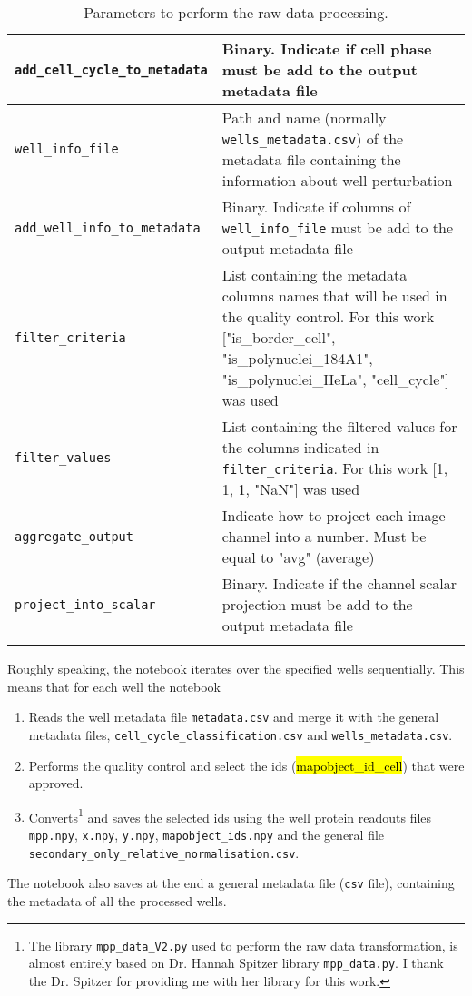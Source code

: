 \begin{longtable}{>{\centering\arraybackslash}m{\mylengtha} | m{\mylengthb}}
    \texttt{add\_cell\_cycle\_to\_metadata} & Binary. Indicate if cell phase must be add to the output metadata file \\
    \hline
    \texttt{well\_info\_file} & Path and name (normally \texttt{wells\_metadata.csv}) of the metadata file containing the information about well perturbation \\
    \hline
    \texttt{add\_well\_info\_to\_metadata} & Binary. Indicate if columns of \texttt{well\_info\_file} must be add to the output metadata file \\
    \hline
    \texttt{filter\_criteria} & List containing the metadata columns names that will be used in the quality control. For this work ["is\_border\_cell", "is\_polynuclei\_184A1", "is\_polynuclei\_HeLa", "cell\_cycle"] was used \\
    \hline
    \texttt{filter\_values} & List containing the filtered values for the columns indicated in \texttt{filter\_criteria}. For this work [1, 1, 1, "NaN"] was used \\
    \hline
    \texttt{aggregate\_output} & Indicate how to project each image channel into a number. Must be equal to "avg" (average) \\
    \hline
    \texttt{project\_into\_scalar} & Binary. Indicate if the channel scalar projection must be add to the output metadata file \\
    \hline
  \caption{Parameters to perform the raw data processing.}
  \label{table:row_data_in:params}
\end{longtable}

Roughly speaking, the notebook iterates over the specified wells sequentially. This means that for each well the notebook
\begin{enumerate}
  \item Reads the well metadata file \texttt{metadata.csv} and merge it with the general metadata files, \texttt{cell\_cycle\_classification.csv} and \texttt{wells\_metadata.csv}.
  \item Performs the quality control and select the ids (\hl{mapobject\_id\_cell}) that were approved.
  \item Converts\footnote{The library \texttt{mpp\_data\_V2.py} used to perform the raw data transformation, is almost entirely based on Dr. Hannah Spitzer library \texttt{mpp\_data.py}. I thank the Dr. Spitzer for providing me with her library for this work.} and saves the selected ids using the well protein readouts files \texttt{mpp.npy}, \texttt{x.npy}, \texttt{y.npy}, \texttt{mapobject\_ids.npy} and the general file \\ \texttt{secondary\_only\_relative\_normalisation.csv}.
\end{enumerate}

The notebook also saves at the end a general metadata file (\texttt{csv} file), containing the metadata of all the processed wells.
